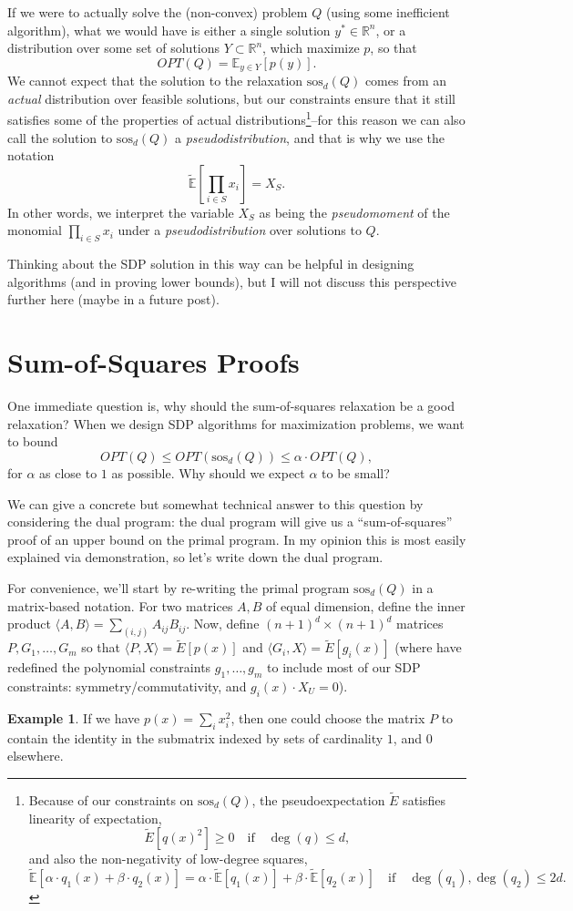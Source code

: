\documentclass[a4paper,11pt]{article}
\newcommand{\R}{\mathbb{R}}
\newcommand{\E}{\mathbb{E}}
\newcommand{\sos}{\mathrm{sos}}
\theoremstyle{definition}
\newtheorem{example}{Example}
\begin{document}
If we were to actually solve the (non-convex) problem $Q$ (using some inefficient algorithm), what we would have is either a single solution $y^*\in \R^n$, or a distribution over some set of solutions $Y\subset \R^n$, which maximize $p$, so that 
\[
OPT(Q) = \E_{y \in Y} [p(y)].
\]
We cannot expect that the solution to the relaxation $\sos_d(Q)$ comes from an {\em actual} distribution over feasible solutions, but our constraints ensure that it still satisfies some of the properties of actual distributions\footnote{
Because of our constraints on $\sos_d(Q)$, the pseudoexpectation $\tilde{E}$ satisfies linearity of expectation,
\[
\tilde{E}[q(x)^2] \ge 0 \quad \text{if} \quad \deg(q)\le d,
\]
and also the non-negativity of low-degree squares, 
\[
\tilde{\E}[\alpha\cdot q_1(x) + \beta \cdot q_2(x)] = \alpha \cdot \tilde{\E}[q_1(x)] + \beta \cdot \tilde{\E}[q_2(x)]\quad \text{if} \quad \deg(q_1),\deg(q_2) \le 2d.
\]

}--for this reason we can also call the solution to $\sos_d(Q)$ a {\em pseudodistribution}, and that is why we use the notation
\[
\tilde{\E}\left[\prod_{i\in S} x_i \right] = X_S.
\]
In other words, we interpret the variable $X_S$ as being the {\em pseudomoment} of the monomial $\prod_{i\in S} x_i$ under a {\em pseudodistribution} over solutions to $Q$.

Thinking about the SDP solution in this way can be helpful in designing algorithms (and in proving lower bounds), but I will not discuss this perspective further here (maybe in a future post).


\section{Sum-of-Squares Proofs}

One immediate question is, why should the sum-of-squares relaxation be a good relaxation?
When we design SDP algorithms for maximization problems, we want to bound
\[
OPT(Q) \le OPT(\sos_d(Q)) \le \alpha \cdot OPT(Q),
\]
for $\alpha$ as close to $1$ as possible.
Why should we expect $\alpha$ to be small?

We can give a concrete but somewhat technical answer to this question by considering the dual program: the dual program will give us a ``sum-of-squares'' proof of an upper bound on the primal program.
In my opinion this is most easily explained via demonstration, so let's write down the dual program.

For convenience, we'll start by re-writing the primal program $\sos_d(Q)$ in a matrix-based notation.
For two matrices $A,B$ of equal dimension, define the inner product $\langle A,B \rangle = \sum_{(i,j)} A_{ij} B_{ij}$.
Now, define $(n+1)^d \times (n+1)^d$ matrices $P,G_1,\ldots,G_{m}$ so that $\langle P, X \rangle = \tilde{E}[p(x)]$ and $\langle G_i,X\rangle = \tilde{E}[g_i(x)]$ (where have redefined the polynomial constraints $g_1,\ldots,g_m$ to include most of our SDP constraints: symmetry/commutativity, and $g_i(x)\cdot X_U = 0$).
\begin{example}
If we have $p(x) = \sum_{i}x_i^2$, then one could choose the matrix $P$ to contain the identity in the submatrix indexed by sets of cardinality $1$, and $0$ elsewhere. 
\end{example}
\end{document}
